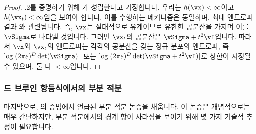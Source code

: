 \documentclass[../../book-main_ko.tex]{subfiles}
\begin{document}
\begin{proof}
    .2를 증명하기 위해 가 성립한다고 가정합니다. 우리는 \(h(\vx) < \infty\)이고 \(h(\vx_{t}) < \infty\)임을 보여야 합니다. 이를 수행하는 메커니즘은 동일하며, 최대 엔트로피 결과 와 관련됩니다. 즉, \(\vx\)는 절대적으로 유계이므로 유한한 공분산을 가지며 이를 \(\vSigma\)로 나타낼 것입니다. 그러면 \(\vx_{t}\)의 공분산은 \(\vSigma + t^{2}\vI\)입니다. 따라서 \(\vx\)와 \(\vx_{t}\)의 엔트로피는 각각의 공분산을 갖는 정규 분포의 엔트로피, 즉 \(\log[(2\pi e)^{D}\det(\vSigma)]\) 또는 \(\log[(2\pi e)^{D}\det(\vSigma + t^{2}\vI)]\)로 상한이 지정될 수 있으며, 둘 다 \(< \infty\)입니다.
\end{proof}

\subsubsection{드 브루인 항등식에서의 부분 적분}

마지막으로, 의 증명에서 언급된 부분 적분 논증을 채웁니다. 이 논증은 개념적으로는 매우 간단하지만, 부분 적분에서의 경계 항이 사라짐을 보이기 위해 몇 가지 기술적 추정이 필요합니다.
\end{document}
